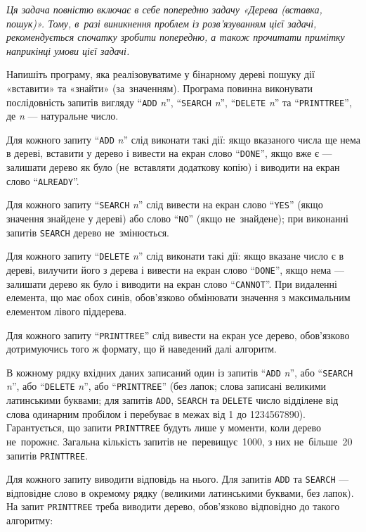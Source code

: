 ﻿{\it
Ця задача повністю включає в себе попередню задачу «Дерева (вставка, пошук)».
Тому, в~разі виникнення проблем із розв'язуванням цієї задачі, рекомендується спочатку зробити попередню, а також прочитати примітку наприкінці умови цієї задачі.
}

Напишіть програму, яка реалізовуватиме у бінарному дереві пошуку дії «вставити» та «знайти» (за~значенням). Програма повинна виконувати  послідовність запитів вигляду ``{\tt ADD} {\it n}'', ``{\tt SEARCH} {\it n}'', ``{\tt DELETE} {\it n}'' та ``{\tt PRINTTREE}'', де {\it n} --- натуральне число.

Для кожного запиту ``{\tt ADD} {\it n}'' слід виконати такі дії: якщо вказаного числа ще нема в дереві, вставити у дерево і вивести на екран слово ``{\tt DONE}'', якщо вже є --- залишати дерево як було (не~вставляти додаткову копію) і виводити на екран слово ``{\tt ALREADY}''.

Для кожного запиту ``{\tt SEARCH} {\it n}'' слід вивести на екран слово ``{\tt YES}'' (якщо значення знайдене у дереві) або слово ``{\tt NO}'' (якщо не~знайдене); при виконанні запитів {\tt SEARCH} дерево не~змінюється.

Для кожного запиту ``{\tt DELETE} {\it n}'' слід виконати такі дії: якщо вказане число є в дереві, вилучити його з дерева і вивести на екран слово ``{\tt DONE}'', якщо нема — залишати дерево як було і виводити на екран слово ``{\tt CANNOT}''. При видаленні елемента, що має обох синів, обов’язково обмінювати значення з максимальним елементом лівого піддерева.

Для кожного запиту ``{\tt PRINTTREE}'' слід вивести на екран усе дерево, обов’язково дотримуючись того ж формату, що й наведений далі алгоритм.

\InputFile
В кожному рядку вхідних даних записаний один із запитів ``{\tt ADD} {\it n}'', або ``{\tt SEARCH} {\it n}'', або ``{\tt DELETE} {\it n}'', або ``{\tt PRINTTREE}'' (без лапок; слова записані великими латинськими буквами; для запитів {\tt ADD}, {\tt SEARCH} та {\tt DELETE} число відділене від слова одинарним пробілом і перебуває в межах від 1 до 1234567890). Гарантується, що запити {\tt PRINTTREE} будуть лише у моменти, коли дерево не~порожнє. Загальна кількість запитів не~перевищує~1000, з них не~більше~20 запитів {\tt PRINTTREE}.

\OutputFile
Для кожного запиту виводити відповідь на нього. Для запитів {\tt ADD} та {\tt SEARCH} --- відповідне слово в окремому рядку (великими латинськими буквами, без лапок). На запит {\tt  PRINTTREE} треба виводити дерево, обов’язково відповідно до такого алгоритму:

